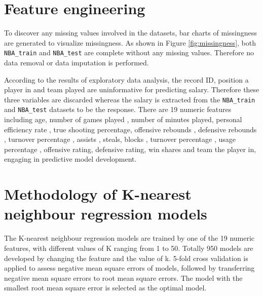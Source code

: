 \documentclass[letterpaper,12pt,twoside,]{pinp}
\begin{document}
\hypertarget{feature-engineering}{%
\section{Feature engineering}\label{feature-engineering}}

To discover any missing values involved in the datasets, bar charts of
missingness are generated to visualize missingness. As shown in Figure
\ref{fig:missingness}, both \texttt{NBA\_train} and \texttt{NBA\_test}
are complete without any missing values. Therefore no data removal or
data imputation is performed.

According to the results of exploratory data analysis, the record ID,
position a player in and team played are uninformative for predicting
salary. Therefore these three variables are discarded whereas the salary
is extracted from the \texttt{NBA\_train} and \texttt{NBA\_test}
datasets to be the response. There are 19 numeric features including
age, number of games played , number of minutes played, personal
efficiency rate , true shooting percentage, offensive rebounds ,
defensive rebounds , turnover percentage , assists , steals, blocks ,
turnover percentage , usage percentage , offensive rating, defensive
rating, win shares and team the player in, engaging in predictive model
development.

\hypertarget{methodology-of-k-nearest-neighbour-regression-models}{%
\section{Methodology of K-nearest neighbour regression
models}\label{methodology-of-k-nearest-neighbour-regression-models}}

The K-nearest neighbour regression models are trained by one of the 19
numeric features, with different values of K ranging from 1 to 50.
Totally 950 models are developed by changing the feature and the value
of k. 5-fold cross validation is applied to assess negative mean square
errors of models, followed by transferring negative mean square errors
to root mean square errors. The model with the smallest root mean square
error is selected as the optimal model.
\end{document}
